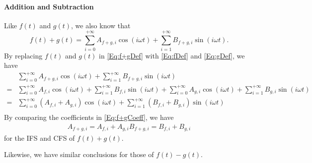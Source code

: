 \documentclass[12pt]{article}
\begin{document}
\paragraph{Addition and Subtraction}\label{App-Para:Addition&Subtraction}
Like $f(t)$ and $g(t)$, we also know that 
\begin{equation}\label{Eq:f+gDef}
	f(t)+g(t)=\sum_{i=0}^{+\infty}A_{f+g, i}\cos(i\omega t)+\sum_{i=1}^{+\infty}B_{f+g, i}\sin(i\omega t).
\end{equation} 
By replacing $f(t)$ and $g(t)$ in \autoref{Eq:f+gDef} with \autoref{Eq:fDef} and \autoref{Eq:gDef}, we have
\begin{equation}\label{Eq:f+gCoeff}
	\begin{aligned}
	&\sum_{i=0}^{+\infty}A_{f+g, i}\cos(i\omega t)+\sum_{i=1}^{+\infty}B_{f+g, i}\sin(i\omega t)\\=&\sum_{i=0}^{+\infty}A_{f, i}\cos(i\omega t)+\sum_{i=1}^{+\infty}B_{f, i}\sin(i\omega t)+\sum_{i=0}^{+\infty}A_{g, i}\cos(i\omega t)+\sum_{i=1}^{+\infty}B_{g, i}\sin(i\omega t)\\
	=&\sum_{i=0}^{+\infty}(A_{f, i}+A_{g,i})\cos(i\omega t)+\sum_{i=1}^{+\infty}(B_{f, i}+B_{g, i})\sin(i\omega t)\\
	\end{aligned}
\end{equation}
By comparing the coefficients in \autoref{Eq:f+gCoeff}, we have
\begin{equation}\label{Eq:f+gConclusion}
	\begin{aligned}
	A_{f+g, i}=A_{f,i}+A_{g, i}
	B_{f+g, i}=B_{f,i}+B_{g, i}
	\end{aligned}
\end{equation}
for the IFS and CFS of $f(t)+g(t)$.

Likewise, we have similar conclusions for those of $f(t)-g(t)$.
\end{document}
